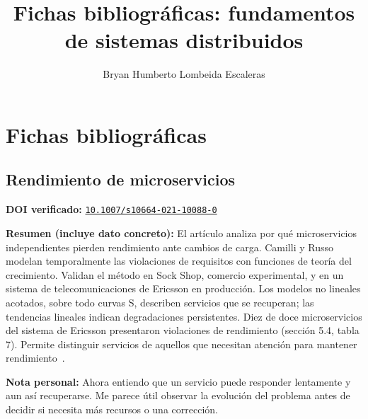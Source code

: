 \documentclass[12pt,a4paper]{article}
\title{Fichas bibliográficas: fundamentos de sistemas distribuidos}
\author{Bryan Humberto Lombeida Escaleras}
\begin{document}
\maketitle

\section{Fichas bibliográficas}
\subsection{Rendimiento de microservicios}
\noindent\textbf{DOI verificado:} \href{https://doi.org/10.1007/s10664-021-10088-0}{\nolinkurl{10.1007/s10664-021-10088-0}}\par
\noindent\textbf{Resumen (incluye dato concreto):} El artículo analiza por qué microservicios independientes pierden rendimiento ante cambios de carga. Camilli y Russo modelan temporalmente las violaciones de requisitos con funciones de teoría del crecimiento. Validan el método en Sock Shop, comercio experimental, y en un sistema de telecomunicaciones de Ericsson en producción. Los modelos no lineales acotados, sobre todo curvas S, describen servicios que se recuperan; las tendencias lineales indican degradaciones persistentes. Diez de doce microservicios del sistema de Ericsson presentaron violaciones de rendimiento (sección 5.4, tabla 7). Permite distinguir servicios de aquellos que necesitan atención para mantener rendimiento~\cite{CamiMattRussBar2022}.\par
\noindent\textbf{Nota personal:} Ahora entiendo que un servicio puede responder lentamente y aun así recuperarse. Me parece útil observar la evolución del problema antes de decidir si necesita más recursos o una corrección.\par
\end{document}
